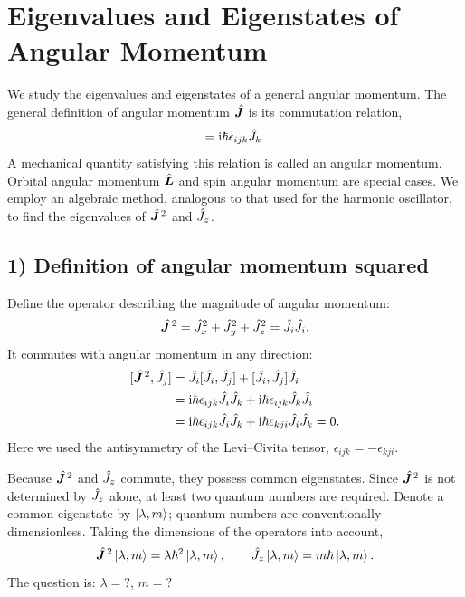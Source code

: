 \section{Eigenvalues and Eigenstates of Angular Momentum}
We study the eigenvalues and eigenstates of a general angular momentum. The general definition of angular momentum $\hat{\bm{J}}$ is its commutation relation,
\begin{equation}
[\op J_i,\op J_j]=\ii\hbar\epsilon_{ijk}\op J_k.
\end{equation}
A mechanical quantity satisfying this relation is called an angular momentum. Orbital angular momentum $\hat{\bm{L}}$ and spin angular momentum are special cases. We employ an algebraic method, analogous to that used for the harmonic oscillator, to find the eigenvalues of $\hat{\bm{J}}^{\,2}$ and $\hat{J}_z$.

\subsection*{1) Definition of angular momentum squared}
Define the operator describing the magnitude of angular momentum:
\begin{equation}
\hat{\bm{J}}^{\,2}=\hat{J}_x^2+\hat{J}_y^2+\hat{J}_z^2=\hat{J}_i\hat{J}_i.
\end{equation}
It commutes with angular momentum in any direction:
\begin{equation}\begin{aligned}
[\op{\vect J}^{\,2},\op J_j]
&=\op J_i[\op J_i,\op J_j]+[\op J_i,\op J_j]\op J_i\\
&=\ii\hbar\epsilon_{ijk}\op J_i\op J_k
+\ii\hbar\epsilon_{ijk}\op J_k\op J_i\\
&=\ii\hbar\epsilon_{ijk}\op J_i\op J_k
+\ii\hbar\epsilon_{kji}\op J_i\op J_k=0.
\end{aligned}\end{equation}
Here we used the antisymmetry of the Levi--Civita tensor, $\epsilon_{ijk}=-\epsilon_{kji}$.

Because $\hat{\bm{J}}^{\,2}$ and $\hat{J}_z$ commute, they possess common eigenstates. Since $\hat{\bm{J}}^{\,2}$ is not determined by $\hat{J}_z$ alone, at least two quantum numbers are required. Denote a common eigenstate by $\left|\lambda,m\right\rangle$; quantum numbers are conventionally dimensionless. Taking the dimensions of the operators into account,
\begin{equation}
\hat{\bm{J}}^{\,2}\left|\lambda,m\right\rangle=\lambda\hbar^2\left|\lambda,m\right\rangle,\qquad
\hat{J}_z\left|\lambda,m\right\rangle=m\hbar\left|\lambda,m\right\rangle.
\end{equation}
The question is: $\lambda=?$, $m=?$

